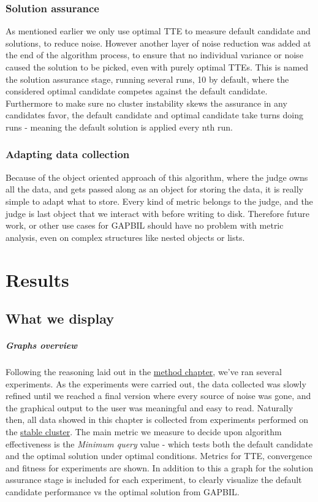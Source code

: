 \documentclass[a4paper,english]{report}
\begin{document}
			\subsection{Solution assurance}
			As mentioned earlier we only use optimal TTE to measure default candidate and solutions, to reduce noise. However another layer of noise reduction was added at the end of the algorithm process, to ensure that no individual variance or noise caused the solution to be picked, even with purely optimal TTEs. This is named the solution assurance stage, running several runs, 10 by default, where the considered optimal candidate competes against the default candidate. Furthermore to make sure no cluster instability skews the assurance in any candidates favor, the default candidate and optimal candidate take turns doing runs - meaning the default solution is applied every nth run.
			\subsection{Adapting data collection}
			Because of the object oriented approach of this algorithm, where the judge owns all the data, and gets passed along as an object for storing the data, it is really simple to adapt what to store. Every kind of metric belongs to the judge, and the judge is last object that we interact with before writing to disk. Therefore future work, or other use cases for GAPBIL should have no problem with metric analysis, even on complex structures like nested objects or lists.
			
	\chapter{Results}
	\label{chap:results}
	\section{What we display}
	\paragraph{Graphs overview}
	Following the reasoning laid out in the \hyperref[chap:method]{method chapter}, we've ran several experiments. As the experiments were carried out, the data collected was slowly refined until we reached a final version where every source of noise was gone, and the graphical output to the user was meaningful and easy to read. Naturally then, all data showed in this chapter is collected from experiments performed on the \hyperref[table:cluster_stable]{stable cluster}. The main metric we measure to decide upon algorithm effectiveness is the \textit{Minimum query} value - which tests both the default candidate and the optimal solution under optimal conditions. Metrics for TTE, convergence and fitness for experiments are shown. In addition to this a graph for the solution assurance stage is included for each experiment, to clearly visualize the default candidate performance vs the optimal solution from GAPBIL.
\end{document}
